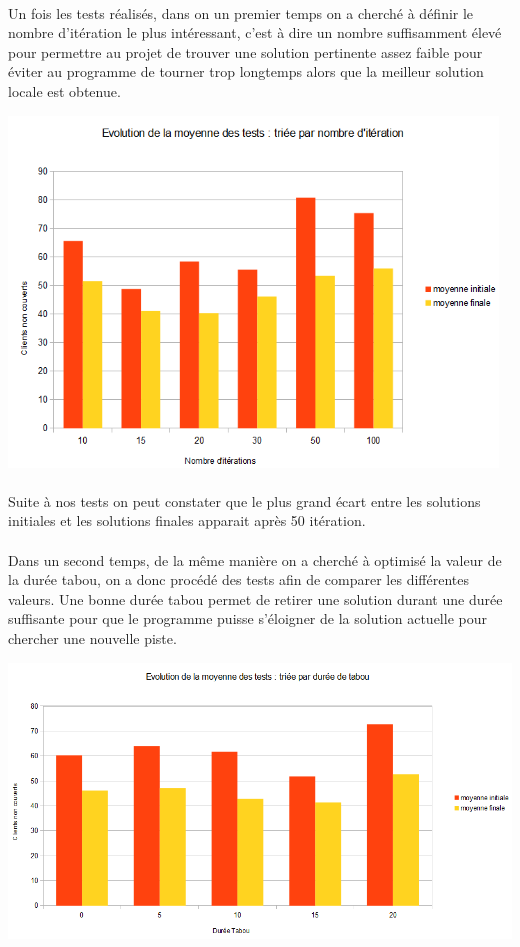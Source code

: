 \documentclass[a4paper, 11pt]{report}
\begin{document}
    \paragraph{}Un fois les tests réalisés, dans on un premier temps on a cherché à définir le
    nombre d'itération le plus intéressant, c'est à dire un nombre suffisamment élevé pour permettre au
    projet de trouver une solution pertinente assez faible pour éviter au programme de tourner trop
    longtemps alors que la meilleur solution locale est obtenue.  
    \begin{center} \includegraphics[width=13cm]{tableau_nombre_iteration} \end{center}
    \paragraph{} Suite à nos tests on peut constater que le plus grand écart entre les solutions
    initiales et les solutions finales apparait après 50 itération.

    \paragraph{}Dans un second temps, de la même manière on a cherché à optimisé la valeur de la
    durée tabou, on a donc procédé des tests afin de comparer les différentes valeurs.
    Une bonne durée tabou permet de retirer une solution durant une durée suffisante pour que le
    programme puisse s'éloigner de la solution actuelle pour chercher une nouvelle piste.
    \begin{center} \includegraphics[width=14cm]{tableau_duree_tabou} \end{center}
\end{document}
